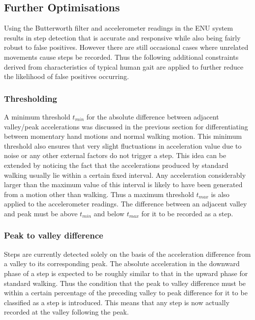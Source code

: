 \documentclass[main.tex]{subfiles}
\begin{document}
\subsection{Further Optimisations}

Using the Butterworth filter and accelerometer readings in the ENU system results in step detection that is accurate and responsive while also being fairly robust to false positives. However there are still occasional cases where unrelated movements cause steps be recorded. Thus the following additional constraints derived from characteristics of typical human gait are applied to further reduce the likelihood of false positives occurring.  

\subsubsection{Thresholding}

A minimum threshold $t_{min}$ for the absolute difference between adjacent valley/peak accelerations was discussed in the previous section for differentiating between momentary hand motions and normal walking motion. This minimum threshold also ensures that very slight fluctuations in acceleration value due to noise or any other external factors do not trigger a step. This idea can be extended by noticing the fact that the accelerations produced by standard walking usually lie within a certain fixed interval. Any acceleration considerably larger than the maximum value of this interval is likely to have been generated from a motion other than walking. Thus a maximum threshold $t_{max}$ is also applied to the accelerometer readings. The difference between an adjacent valley and peak must be above $t_{min}$ and below $t_{max}$ for it to be recorded as a step. 

\subsubsection{Peak to valley difference}

Steps are currently detected solely on the basis of the acceleration difference from a valley to its corresponding peak. The absolute acceleration in the downward phase of a step is expected to be roughly similar to that in the upward phase for standard walking. Thus the condition that the peak to valley difference must be within a certain percentage of the preceding valley to peak difference for it to be classified as a step is introduced. This means that any step is now actually recorded at the valley following the peak.   
\end{document}
